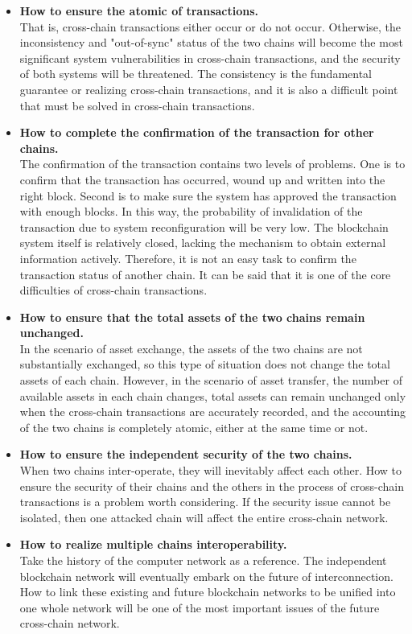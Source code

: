 \begin{itemize}
    \item \textbf{How to ensure the atomic of transactions.}\\
    That is, cross-chain transactions either occur or do not occur. Otherwise, the inconsistency and "out-of-sync" status of the two chains will become the most significant system vulnerabilities in cross-chain transactions, and the security of both systems will be threatened. The consistency is the fundamental guarantee or realizing cross-chain transactions, and it is also a difficult point that must be solved in cross-chain transactions.
    \item \textbf{How to complete the confirmation of the transaction for other chains.} \\
The confirmation of the transaction contains two levels of problems. One is to confirm that the transaction has occurred, wound up and written into the right block. Second is to make sure the system has approved the transaction with enough blocks.  In this way, the probability of invalidation of the transaction due to system reconfiguration will be very low. The blockchain system itself is relatively closed, lacking the mechanism to obtain external information actively. Therefore, it is not an easy task to confirm the transaction status of another chain. It can be said that it is one of the core difficulties of cross-chain transactions.
    \item \textbf{How to ensure that the total assets of the two chains remain unchanged.} \\
    In the scenario of asset exchange, the assets of the two chains are not substantially exchanged, so this type of situation does not change the total assets of each chain. However, in the scenario of asset transfer, the number of available assets in each chain changes, total assets can remain unchanged only when the cross-chain transactions are accurately recorded, and the accounting of the two chains is completely atomic, either at the same time or not. 
    \item \textbf{How to ensure the independent security of the two chains.} \\
    When two chains inter-operate, they will inevitably affect each other. How to ensure the security of their chains and the others in the process of cross-chain transactions is a problem worth considering. If the security issue cannot be isolated, then one attacked chain will affect the entire cross-chain network.
    \item \textbf{How to realize multiple chains interoperability.} \\
    Take the history of the computer network as a reference. The independent blockchain network will eventually embark on the future of interconnection. How to link these existing and future blockchain networks to be unified into one whole network will be one of the most important issues of the future cross-chain network. 
\end{itemize}


